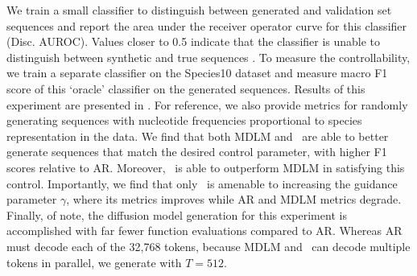 \documentclass{article} %
\begin{document}
We train a small classifier to distinguish between generated and validation set sequences and report the area under the receiver operator curve for this classifier (Disc. AUROC).
Values closer to 0.5 indicate that the classifier is unable to distinguish between synthetic and true sequences \citep{sarkar2024designing}.
To measure the controllability, we train a separate classifier on the Species10 dataset and measure macro F1 score of this `oracle' classifier on the generated sequences.
Results of this experiment are presented in .
For reference, we also provide metrics for randomly generating sequences with nucleotide frequencies proportional to species representation in the data.
We find that both MDLM and \method~are able to better generate sequences that match the desired control parameter, with higher F1 scores relative to AR.
Moreover, \method~is able to outperform MDLM in satisfying this control.
Importantly, we find that only \method~is amenable to increasing the guidance parameter $\gamma$, where its metrics improves while AR and MDLM metrics degrade.
Finally, of note, the diffusion model generation for this experiment is accomplished with far fewer function evaluations compared to AR.
Whereas AR must decode each of the 32,768 tokens, because MDLM and \method~can decode multiple tokens in parallel, we generate with $T = 512.$
\end{document}
